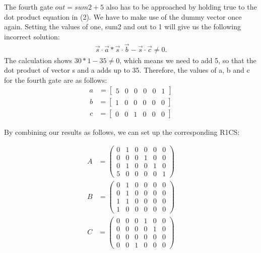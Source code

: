 The fourth gate \(out=sum2+5\) also has to be approached by holding true to the dot product equation in (2). We have to make use of the dummy vector once again. Setting the values of one, sum2 and out to 1 will give us the following incorrect solution:
\begin{align*}
     \Vec{s}\cdot\Vec{a} * \Vec{s}\cdot\Vec{b} - \Vec{s}\cdot\Vec{c} \neq 0.
\end{align*}
The calculation shows \(30 * 1 - 35 \neq 0\), which means we need to add 5, so that the dot product of vector s and a adds up to 35. Therefore, the values of a, b and c for the fourth gate are as follows:
\begin{align*}
    a &=\begin{bmatrix}
        5 & 0 & 0 & 0 & 0 & 1
    \end{bmatrix}
\end{align*}
\begin{align*}
    b&=\begin{bmatrix}
        1 & 0 & 0 & 0 & 0 & 0 
    \end{bmatrix}
\end{align*}
\begin{align*}
    c&=\begin{bmatrix}
        0 & 0 & 1 & 0 & 0 & 0
    \end{bmatrix}
\end{align*}

By combining our results as follows, we can set up the corresponding R1CS:

\begin{align}
A&=\begin{pmatrix}
    0 & 1 & 0 & 0 & 0 & 0 \\
    0 & 0 & 0 & 1 & 0 & 0 \\
    0 & 1 & 0 & 0 & 1 & 0 \\
    5 & 0 & 0 & 0 & 0 & 1
\end{pmatrix}
\end{align}
\begin{align*}
B&=\begin{pmatrix}
    0 & 1 & 0 & 0 & 0 & 0 \\
    0 & 1 & 0 & 0 & 0 & 0 \\
    1 & 1 & 0 & 0 & 0 & 0 \\
    1 & 0 & 0 & 0 & 0 & 0
\end{pmatrix}
\end{align*}
\begin{align*}
C&=\begin{pmatrix}
    0 & 0 & 0 & 1 & 0 & 0 \\
    0 & 0 & 0 & 0 & 1 & 0 \\
    0 & 0 & 0 & 0 & 0 & 0 \\
    0 & 0 & 1 & 0 & 0 & 0
\end{pmatrix}
\end{align*}

